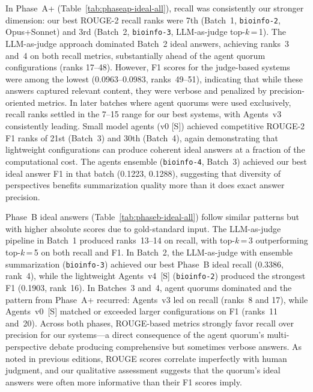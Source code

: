 In Phase~A+ (Table~\ref{tab:phaseap-ideal-all}), recall was consistently our
stronger dimension: our best ROUGE-2 recall ranks were 7th (Batch~1,
\texttt{bioinfo-2}, Opus+Sonnet) and 3rd (Batch~2, \texttt{bioinfo-3},
LLM-as-judge top-$k$\,=\,1). The LLM-as-judge approach dominated Batch~2 ideal
answers, achieving ranks~3 and~4 on both recall metrics, substantially ahead of
the agent quorum configurations (ranks 17--48). However, F1 scores for the
judge-based systems were among the lowest (0.0963--0.0983, ranks~49--51),
indicating that while these answers captured relevant content, they were verbose
and penalized by precision-oriented metrics. In later batches where agent quorums
were used exclusively, recall ranks settled in the 7--15 range for our best
systems, with Agents~v3 consistently leading. Small model agents (v0 [S])
achieved competitive ROUGE-2 F1 ranks of 21st (Batch~3) and 30th (Batch~4),
again demonstrating that lightweight configurations can produce coherent ideal
answers at a fraction of the computational cost. The agents ensemble
(\texttt{bioinfo-4}, Batch~3) achieved our best ideal answer F1 in that batch
(0.1223, 0.1288), suggesting that diversity of perspectives benefits
summarization quality more than it does exact answer precision.

Phase~B ideal answers (Table~\ref{tab:phaseb-ideal-all}) follow similar patterns
but with higher absolute scores due to gold-standard input. The LLM-as-judge
pipeline in Batch~1 produced ranks~13--14 on recall, with top-$k$\,=\,3
outperforming top-$k$\,=\,5 on both recall and F1. In Batch~2, the
LLM-as-judge with ensemble summarization (\texttt{bioinfo-3}) achieved our best
Phase~B ideal recall (0.3386, rank~4), while the lightweight Agents~v4~[S]
(\texttt{bioinfo-2}) produced the strongest F1 (0.1903, rank~16). In Batches~3
and~4, agent quorums dominated and the pattern from Phase~A+ recurred: Agents~v3
led on recall (ranks~8 and 17), while Agents~v0~[S] matched or exceeded larger
configurations on F1 (ranks~11 and~20). Across both phases, ROUGE-based metrics
strongly favor recall over precision for our systems---a direct consequence of
the agent quorum's multi-perspective debate producing comprehensive but sometimes
verbose answers. As noted in previous editions, ROUGE scores correlate imperfectly
with human judgment, and our qualitative assessment suggests that the quorum's
ideal answers were often more informative than their F1 scores imply.

